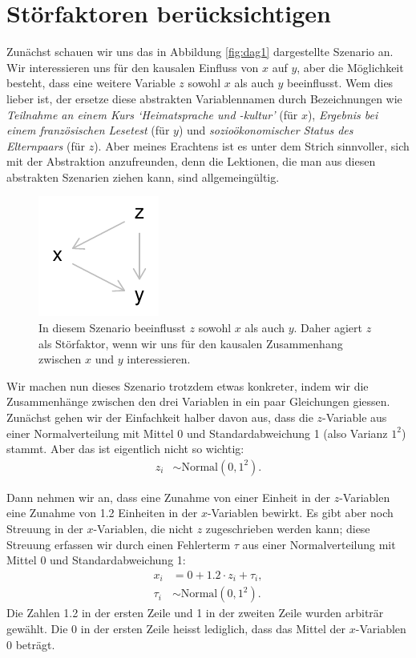 \section{Störfaktoren berücksichtigen}\label{sec:störfaktoren}
Zunächst schauen wir uns das in Abbildung \ref{fig:dag1} dargestellte Szenario an.
Wir interessieren uns für den kausalen Einfluss von $x$ auf $y$,
aber die Möglichkeit besteht, dass eine weitere Variable $z$ sowohl $x$ als auch
$y$ beeinflusst. Wem dies lieber ist, der ersetze diese abstrakten Variablennamen
durch Bezeichnungen wie
\textit{Teilnahme an einem Kurs `Heimatsprache und -kultur'} (für $x$),
\textit{Ergebnis bei einem französischen Lesetest} (für $y$)
und \textit{sozioökonomischer Status des Elternpaars} (für $z$).
Aber meines Erachtens ist es unter dem Strich sinnvoller, sich mit der
Abstraktion anzufreunden, denn die Lektionen, die man aus diesen abstrakten
Szenarien ziehen kann, sind allgemeingültig.

\begin{knitrout}
\color{fgcolor}\begin{figure}
\includegraphics[width=.2\textwidth]{figure/unnamed-chunk-1-1} \caption{In diesem Szenario beeinflusst $z$ sowohl $x$ als auch $y$. Daher agiert $z$ als Störfaktor, wenn wir uns für den kausalen Zusammenhang zwischen $x$ und $y$ interessieren.\label{fig:dag1}}\label{fig:unnamed-chunk-1}
\end{figure}

\end{knitrout}

Wir machen nun dieses Szenario trotzdem etwas konkreter,
indem wir die Zusammenhänge zwischen den drei Variablen
in ein paar Gleichungen giessen.
Zunächst gehen wir der Einfachkeit halber davon aus,
dass die $z$-Variable aus einer Normalverteilung mit Mittel
0 und Standardabweichung 1 (also Varianz $1^2$) stammt.
Aber das ist eigentlich nicht so wichtig:
\begin{align}
z_i &\sim \textrm{Normal}(0, 1^2). \nonumber
\end{align}

Dann nehmen wir an, dass eine Zunahme von einer Einheit in der $z$-Variablen
eine Zunahme von 1.2 Einheiten in der $x$-Variablen bewirkt.
Es gibt aber noch Streuung in der $x$-Variablen, die nicht $z$ zugeschrieben
werden kann; diese Streuung erfassen wir durch einen Fehlerterm $\tau$
aus einer Normalverteilung mit Mittel 0 und Standardabweichung 1:
\begin{align}
x_i &= 0 + 1.2\cdot z_i + \tau_i, \label{eq:dag1_x} \\
\tau_i &\sim \textrm{Normal}(0, 1^2). \nonumber
\end{align}
Die Zahlen 1.2 in der ersten Zeile und 1 in der zweiten Zeile
wurden arbiträr gewählt. Die 0 in der ersten Zeile heisst lediglich,
dass das Mittel der $x$-Variablen 0 beträgt.

